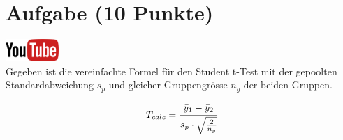 \documentclass[a4paper, 10pt]{scrartcl}\usepackage[]{graphicx}\usepackage[]{xcolor}
\begin{document}
 
\clearpage

\section{Aufgabe \hfill (10 Punkte)}

\hfill\href{https://youtu.be/bc1m7rkXld4}{\includegraphics[width =
  2cm]{img/youtube}}\\[1Ex]



Gegeben ist die vereinfachte Formel f{\"u}r den Student t-Test mit der
gepoolten Standardabweichung $s_p$ und gleicher Gruppengr{\"o}sse $n_g$ der
beiden Gruppen.

\begin{equation*}
  \label{eq:1}
  T_{calc} = \cfrac{\bar{y}_1 - \bar{y}_2}{s_p \cdot \sqrt{\tfrac{2}{n_g}}}
\end{equation*}
\end{document}
